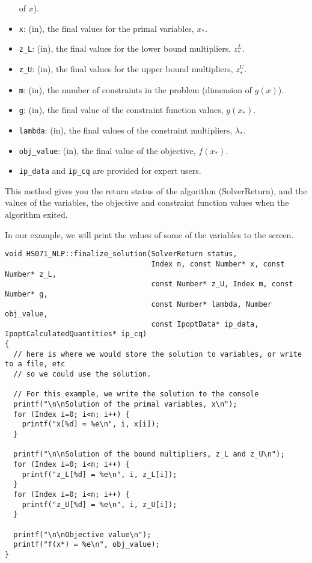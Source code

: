 \documentclass[10pt]{article}
\begin{document}
\begin{itemize}
  of $x$).
\item {\tt x}: (in), the final values for the primal variables, $x_*$.
\item {\tt z\_L}: (in), the final values for the lower bound
  multipliers, $z^L_*$.
\item {\tt z\_U}: (in), the final values for the upper bound
  multipliers, $z^U_*$.
\item {\tt m}: (in), the number of constraints in the problem
  (dimension of $g(x)$).
\item {\tt g}: (in), the final value of the constraint function
  values, $g(x_*)$.
\item {\tt lambda}: (in), the final values of the constraint
  multipliers, $\lambda_*$.
\item {\tt obj\_value}: (in), the final value of the objective,
  $f(x_*)$.
\item {\tt ip\_data} and {\tt ip\_cq} are provided for expert users.
\end{itemize}

This method gives you the return status of the algorithm
(SolverReturn), and the values of the variables, 
the objective and constraint function values when the algorithm exited.

In our example, we will print the values of some of the variables to 
the screen.

\begin{footnotesize}
\begin{verbatim}
void HS071_NLP::finalize_solution(SolverReturn status,
                                  Index n, const Number* x, const Number* z_L,
                                  const Number* z_U, Index m, const Number* g,
                                  const Number* lambda, Number obj_value,
                                  const IpoptData* ip_data, IpoptCalculatedQuantities* ip_cq)                                  
{
  // here is where we would store the solution to variables, or write to a file, etc
  // so we could use the solution. 

  // For this example, we write the solution to the console
  printf("\n\nSolution of the primal variables, x\n");
  for (Index i=0; i<n; i++) {
    printf("x[%d] = %e\n", i, x[i]); 
  }

  printf("\n\nSolution of the bound multipliers, z_L and z_U\n");
  for (Index i=0; i<n; i++) {
    printf("z_L[%d] = %e\n", i, z_L[i]); 
  }
  for (Index i=0; i<n; i++) {
    printf("z_U[%d] = %e\n", i, z_U[i]); 
  }

  printf("\n\nObjective value\n");
  printf("f(x*) = %e\n", obj_value); 
}
\end{verbatim}
\end{footnotesize}
\end{document}
